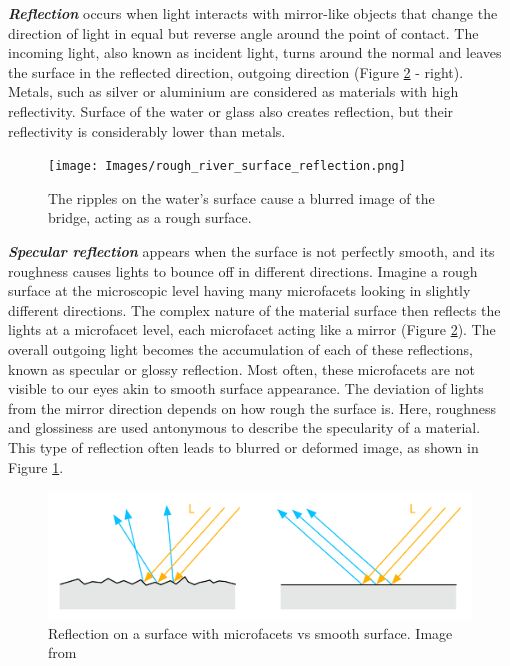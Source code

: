 \textbf{\textit{Reflection}} occurs when light interacts with mirror-like objects that change the direction of light in equal but reverse angle around the point of contact. The incoming light, also known as incident light, turns around the normal and leaves the surface in the reflected direction, outgoing direction (Figure \ref{fig:microfacet} - right). Metals, such as silver or aluminium are considered as materials with high reflectivity. Surface of the water or glass also creates reflection, but their reflectivity is considerably lower than metals.

\begin{figure}
\texttt{[image: Images/rough\_river\_surface\_reflection.png]}
\caption{The ripples on the water's surface cause a blurred image of the bridge, acting as a rough surface.}\label{fig:water_reflection}
    
\end{figure} 

\textbf{\textit{Specular reflection}} appears when the surface is not perfectly smooth, and its roughness causes lights to bounce off in different directions. Imagine a rough surface at the microscopic level having many microfacets looking in slightly different directions. The complex nature of the material surface then reflects the lights at a microfacet level, each microfacet acting like a mirror (Figure \ref{fig:microfacet}). The overall outgoing light becomes the accumulation of each of these reflections, known as specular or glossy reflection. Most often, these microfacets are not visible to our eyes akin to smooth surface appearance. The deviation of lights from the mirror direction depends on how rough the surface is. Here, roughness and glossiness are used antonymous to describe the specularity of a material. This type of reflection often leads to blurred or deformed image, as shown in Figure \ref{fig:water_reflection}. 


\begin{figure}
\includegraphics[width=0.9\linewidth]{Images/diagram_microfacet.png}
\caption{Reflection on a surface with microfacets vs smooth surface. Image from \citeauthor{googlePhysicallyBased} \cite{googlePhysicallyBased}}\label{fig:microfacet}
    
\end{figure} 


